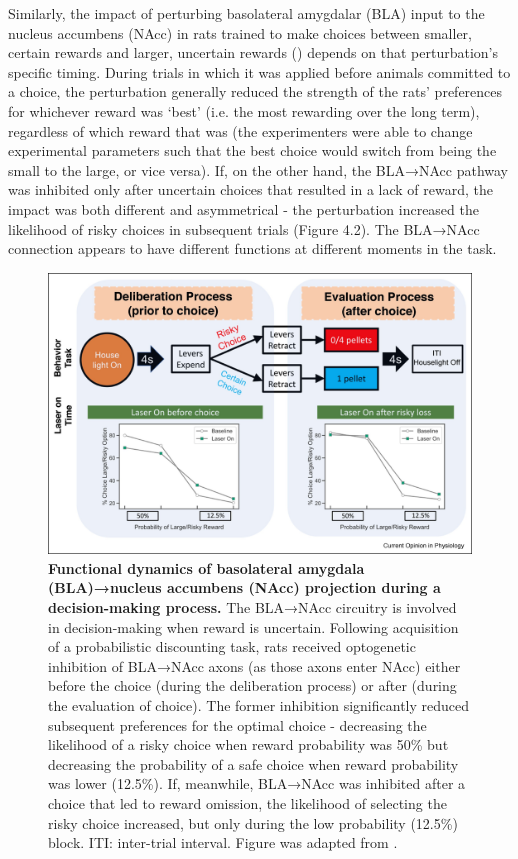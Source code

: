 \begin{refsection}
Similarly, the impact of perturbing basolateral amygdalar (BLA) input to the nucleus accumbens (NAcc) in rats trained to make choices between smaller, certain rewards and larger, uncertain rewards (\cite{bercovici2018a}) depends on that perturbation’s specific timing. During trials in which it was applied before animals committed to a choice, the perturbation generally reduced the strength of the rats’ preferences for whichever reward was ‘best’ (i.e. the most rewarding over the long term), regardless of which reward that was (the experimenters were able to change experimental parameters such that the best choice would switch from being the small to the large, or vice versa). If, on the other hand, the BLA→NAcc pathway was inhibited only after uncertain choices that resulted in a lack of reward, the impact was both different and asymmetrical - the perturbation increased the likelihood of risky choices in subsequent trials (Figure 4.2). The BLA→NAcc connection appears to have different functions at different moments in the task.

\begin{figure}
\includegraphics[width=\linewidth]{lin_2021_review_figs/1-s2.0-S2468867320301693-gr2_lrg.jpg}
\caption{\textbf{Functional dynamics of basolateral amygdala (BLA)→nucleus accumbens (NAcc) projection during a decision-making process.} The BLA→NAcc circuitry is involved in decision-making when reward is uncertain. Following acquisition of a probabilistic discounting task, rats received optogenetic inhibition of BLA→NAcc axons (as those axons enter NAcc) either before the choice (during the deliberation process) or after (during the evaluation of choice). The former inhibition significantly reduced subsequent preferences for the optimal choice - decreasing the likelihood of a risky choice when reward probability was 50\% but decreasing the probability of a safe choice when reward probability was lower (12.5\%). If, meanwhile, BLA→NAcc was inhibited after a choice that led to reward omission, the likelihood of selecting the risky choice increased, but only during the low probability (12.5\%) block. ITI: inter-trial interval. Figure was adapted from \cite{bercovici2018a}.}
\label{fig:wrapfig}
\end{figure}


\end{refsection}
